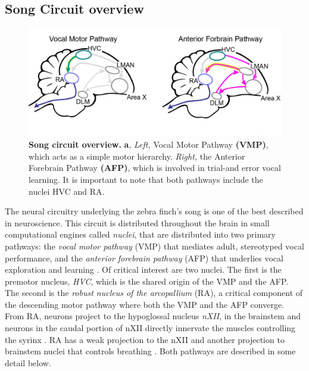 \subsection{ Song Circuit overview}

\begin{figure}[!htb]
    \includegraphics[width=14cm]{figure2.jpg}
    \centering
\medskip
\caption[Song circuit overview]{\footnotesize  \textbf{Song circuit overview.} \textbf{a}, \textit{Left,} Vocal Motor Pathway \textbf{(VMP)}, which acts as a simple motor hierarchy.  \textit{Right,} the Anterior Forebrain Pathway \textbf{(AFP)}, which is involved in trial-and error vocal learning.  It is important to note that both pathways include the nuclei HVC and RA.}

\label{fig:Sampling}
\end{figure}


The neural circuitry underlying the zebra finch's song is one of the best described in neuroscience. This circuit is distributed throughout the brain in small computational engines called \emph{nuclei}, that are distributed into two primary pathways: the\emph{ vocal motor pathway} (VMP) that mediates adult, stereotyped vocal performance, and the \emph{anterior forebrain pathway} (AFP) that underlies vocal exploration and learning \cite{Aronov2008-kx} \cite{Olveczky2005-mc}. Of critical interest are two nuclei. The first is the premotor nucleus,\emph{ HVC}, which is the shared origin of the VMP and the AFP. The second is the \emph{robust nucleus of the arcopallium} (RA), a critical component of the descending motor pathway where both the VMP and the AFP converge. From RA, neurons project to the hypoglossal nucleus \emph{nXII}, in the brainstem and neurons in the caudal portion of nXII directly innervate the muscles controlling the syrinx \cite{Olveczky2005-mc} \cite{Vicario1988-dl}. RA has a weak projection to the nXII and another projection to brainstem nuclei that controls breathing \cite{Sturdy2003-ed} \cite{Krutzfeldt2004-po}. Both pathways are described in some detail below. 


